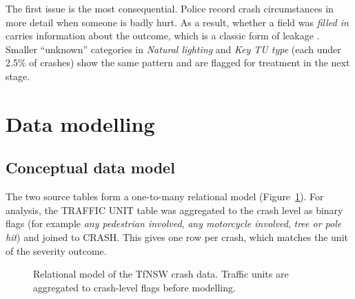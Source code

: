 \documentclass[11pt,a4paper]{article}
\begin{document}
The first issue is the most consequential. Police record crash circumstances in more detail when someone is
badly hurt. As a result, whether a field was \emph{filled in} carries information about the outcome, which is
a classic form of leakage \parencite{kaufman2012}. Smaller \enquote{unknown} categories in \emph{Natural lighting}
and \emph{Key TU type} (each under 2.5\% of crashes) show the same pattern and are flagged for treatment in
the next stage.

\section{Data modelling}
\label{sec:model}

\subsection{Conceptual data model}
The two source tables form a one-to-many relational model (Figure~\ref{fig:erd}). For analysis, the
TRAFFIC UNIT table was aggregated to the crash level as binary flags (for example \emph{any pedestrian
involved}, \emph{any motorcycle involved}, \emph{tree or pole hit}) and joined to CRASH. This gives one row per
crash, which matches the unit of the severity outcome.

\begin{figure}[H]
\centering
{}
\caption{Relational model of the TfNSW crash data. Traffic units are aggregated to crash-level flags before modelling.}
\label{fig:erd}
\end{figure}
\end{document}
